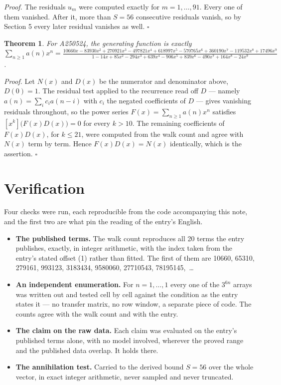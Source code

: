 \documentclass[11pt]{article}
\newtheorem{theorem}{Theorem}
\theoremstyle{definition}
\begin{document}
{\itshape Proof.} The residuals $u_m$ were computed exactly for $m = 1,\dots,91$. Every one of them vanished. After it, more than $S = 56$ consecutive residuals vanish, so by Section 5 every later residual vanishes as well. $\square$

\begin{theorem} For A250524, the generating function is exactly $\sum_{n\ge 1} a(n)x^n = \frac{10660x - 83930x^{2} + 270921x^{3} - 497821x^{4} + 618997x^{5} - 570765x^{6} + 360190x^{7} - 119532x^{8} + 17496x^{9}}{1 - 14x + 85x^{2} - 294x^{3} + 639x^{4} - 906x^{5} + 839x^{6} - 490x^{7} + 164x^{8} - 24x^{9}}$.\end{theorem}

{\itshape Proof.} Let $N(x)$ and $D(x)$ be the numerator and denominator above, $D(0)=1$. The residual test applied to the recurrence read off $D$ --- namely $a(n) = \sum_i c_i a(n-i)$ with $c_i$ the negated coefficients of $D$ --- gives vanishing residuals throughout, so the power series $F(x)=\sum_{n\ge 1}a(n)x^n$ satisfies $[x^k]\bigl(F(x)D(x)\bigr) = 0$ for every $k > 10$. The remaining coefficients of $F(x)D(x)$, for $k \le 21$, were computed from the walk count and agree with $N(x)$ term by term. Hence $F(x)D(x) = N(x)$ identically, which is the assertion. $\square$

\section{Verification}

Four checks were run, each reproducible from the code accompanying this note, and the first two are what pin the reading of the entry's English.

\begin{itemize}

\item {\bfseries The published terms.} The walk count reproduces all 20 terms the entry publishes, exactly, in integer arithmetic, with the index taken from the entry's stated offset (1) rather than fitted. The first of them are 10660, 65310, 279161, 993123, 3183434, 9580060, 27710543, 78195145,~\dots

\item {\bfseries An independent enumeration.} For $n = 1,\dots,1$ every one of the $3^{6n}$ arrays was written out and tested cell by cell against the condition as the entry states it --- no transfer matrix, no row window, a separate piece of code. The counts agree with the walk count and with the entry.

\item {\bfseries The claim on the raw data.} Each claim was evaluated on the entry's published terms alone, with no model involved, wherever the proved range and the published data overlap. It holds there.

\item {\bfseries The annihilation test.} Carried to the derived bound $S = 56$ over the whole vector, in exact integer arithmetic, never sampled and never truncated.

\end{itemize}
\end{document}
